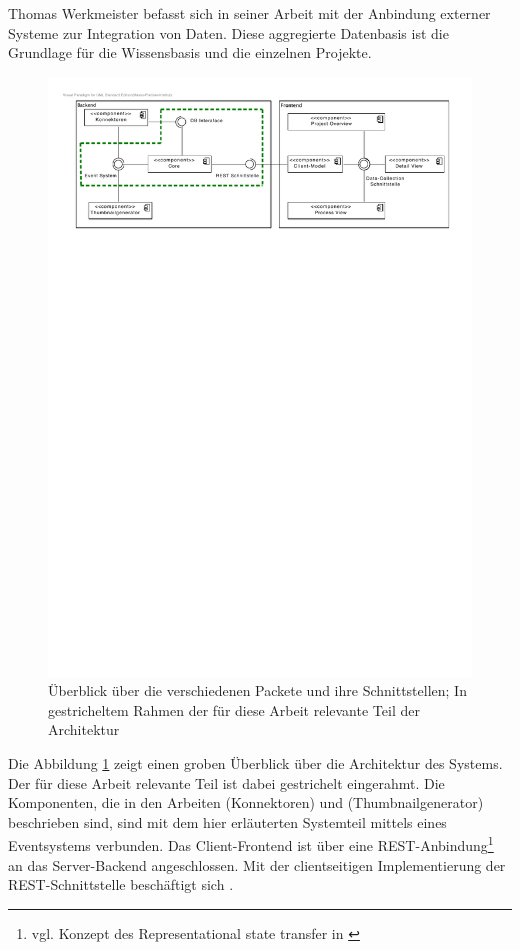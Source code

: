 Thomas Werkmeister befasst sich in seiner Arbeit \cite{bp-tewe} mit der Anbindung externer Systeme zur Integration von Daten. Diese aggregierte Datenbasis ist die Grundlage für die Wissensbasis und die einzelnen Projekte.

\begin{figure}[h]  
  \centering     
  \includegraphics[width=1.0\textwidth]{img/architecture_overview.pdf}  
   \caption{Überblick über die verschiedenen Packete und ihre Schnittstellen; In gestricheltem Rahmen der für diese Arbeit relevante Teil der Architektur}
  \label{fig:architecture-overview} 
\end{figure}

Die Abbildung \ref{fig:architecture-overview} zeigt einen groben Überblick über die Architektur des Systems. Der für diese Arbeit relevante Teil ist dabei gestrichelt eingerahmt. Die Komponenten, die in den Arbeiten \cite{bp-tewe} (Konnektoren) und \cite{bp-dome} (Thumbnailgenerator) beschrieben sind, sind mit dem hier erläuterten Systemteil mittels eines Eventsystems verbunden. Das Client-Frontend ist über eine REST-Anbindung\footnote{vgl. Konzept des Representational state transfer in \cite{rest}} an das Server-Backend angeschlossen. Mit der clientseitigen Implementierung der REST-Schnittstelle beschäftigt sich \cite{bp-norman}.

